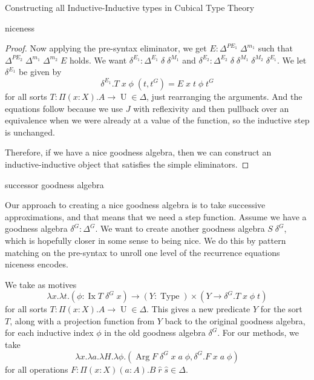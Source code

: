 \documentclass[runningheads]{llncs}
\DeclareMathOperator{\USet}{Type}
\DeclareMathOperator{\UU}{U}
\DeclareMathOperator{\Arg}{Arg}
\DeclareMathOperator{\Ix}{Ix}
\begin{document}
{\begin{section}{Constructing all Inductive-Inductive types in Cubical Type Theory}
\begin{subsection}{niceness}
\begin{proof}
Now applying the pre-syntax eliminator, we get $E : \Delta^{PE_1}\;\Delta^{m_1}$ such that $\Delta^{PE_2}\;\Delta^{m_1}\;\Delta^{m_2}\;E$ holds. We want $\delta^{E_1} : \Delta^{E_1}\;\delta\;\delta^{M_1}$ and $\delta^{E_2} : \Delta^{E_2}\;\delta\;\delta^{M_1}\;\delta^{M_2}\;\delta^{E_1}$.
We let $\delta^{E_1}$ be given by \[\delta^{E_1}.T\;x\;\phi\;(t,t^G) = E\;x\;t\;\phi\;t^G\] for all sorts $T : \Pi(x : X).A\to\UU\in\Delta$, just rearranging the arguments. And the equations follow because we use $J$ with reflexivity and then pullback over an equivalence when we were already at a value of the function, so the inductive step is unchanged.

Therefore, if we have a nice goodness algebra, then we can construct an inductive-inductive object that satisfies the simple eliminators.
\end{proof}

\end{subsection}
\begin{subsection}{successor goodness algebra}\label{successor-alg}

Our approach to creating a nice goodness algebra is to take successive approximations, and that means that we need a step function. Assume we have a goodness algebra $\delta^G : \Delta^G$. We want to create another goodness algebra $S\;\delta^G$, which is hopefully closer in some sense to being nice. We do this by pattern matching on the pre-syntax to unroll one level of the recurrence equations niceness encodes.

We take as motives \[\lambda x.\lambda t.(\phi : \Ix T \;\delta^G\;x) \to (Y : \USet)\times (Y \to \delta^G.T\;x\;\phi\;t)\] for all sorts $T : \Pi(x : X).A \to \UU \in\Delta$. This gives a new predicate $Y$ for the sort $T$, along with a projection function from $Y$ back to the original goodness algebra, for each inductive index $\phi$ in the old goodness algebra $\delta^G$.
For our methods, we take \[\lambda x.\lambda a.\lambda H.\lambda \phi. (\Arg F\;\delta^G\;x\;a\;\phi , \delta^G.F\;x\;a\;\phi)\] for all operations $F : \Pi(x : X)(a : A).B\;\hat{r}\;\hat{s}\in\Delta$. 


\end{subsection}
\end{section}}
\end{document}
